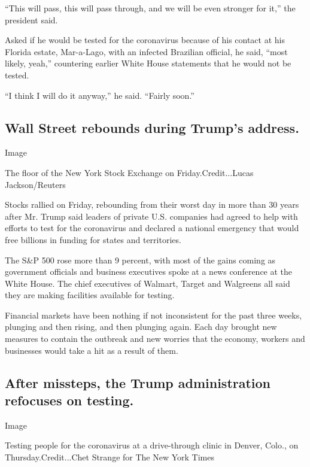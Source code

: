 ``This will pass, this will pass through, and we will be even stronger
for it,'' the president said.

Asked if he would be tested for the coronavirus because of his contact
at his Florida estate, Mar-a-Lago, with an infected Brazilian official,
he said, ``most likely, yeah,'' countering earlier White House
statements that he would not be tested.

``I think I will do it anyway,'' he said. ``Fairly soon.''

\hypertarget{wall-street-rebounds-during-trumps-address}{%
\subsection{Wall Street rebounds during Trump's
address.}\label{wall-street-rebounds-during-trumps-address}}

Image

The floor of the New York Stock Exchange on Friday.Credit...Lucas
Jackson/Reuters

Stocks rallied on Friday, rebounding from their worst day in more than
30 years after Mr. Trump said leaders of private U.S. companies had
agreed to help with efforts to test for the coronavirus and declared a
national emergency that would free billions in funding for states and
territories.

The S\&P 500 rose more than 9 percent, with most of the gains coming as
government officials and business executives spoke at a news conference
at the White House. The chief executives of Walmart, Target and
Walgreens all said they are making facilities available for testing.

Financial markets have been nothing if not inconsistent for the past
three weeks, plunging and then rising, and then plunging again. Each day
brought new measures to contain the outbreak and new worries that the
economy, workers and businesses would take a hit as a result of them.

\hypertarget{after-missteps-the-trump-administration-refocuses-on-testing}{%
\subsection{After missteps, the Trump administration refocuses on
testing.}\label{after-missteps-the-trump-administration-refocuses-on-testing}}

Image

Testing people for the coronavirus at a drive-through clinic in Denver,
Colo., on Thursday.Credit...Chet Strange for The New York Times

